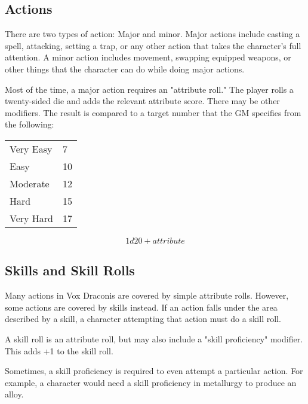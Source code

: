 \begin{multicols}{2}
\section{Actions}

There are two types of action: Major and minor. Major actions
include casting a spell, attacking, setting a trap, or any other
action that takes the character's full attention. A minor action
includes movement, swapping equipped weapons, or other things
that the character can do while doing major actions.

Most of the time, a major action requires an "attribute roll." The
player rolls a twenty-sided die and adds the relevant attribute
score. There may be other modifiers. The result is compared to
a target number that the GM specifies from the following:

\begin{center}
{
\begin{xtabular}{|l|l|}
Very Easy & 7 \\
Easy & 10 \\
Moderate & 12 \\
Hard & 15 \\
Very Hard & 17 \\
\hline
\end{xtabular}
}
\end{center}

$$1d20 + attribute$$

\subsection{Skills and Skill Rolls}

Many actions in Vox Draconis are covered by simple attribute
rolls. However, some actions are covered by skills instead.
If an action falls under the area described by a skill, a
character attempting that action must do a skill roll.

A skill roll is an attribute roll, but may also include a "skill
proficiency" modifier. This adds +1 to the skill roll.

Sometimes, a skill proficiency is required to even attempt a
particular action. For example, a character would need a skill
proficiency in metallurgy to produce an alloy.


\end{multicols}
